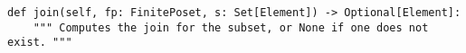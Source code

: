 \begin{verbatim}
def join(self, fp: FinitePoset, s: Set[Element]) -> Optional[Element]:
    """ Computes the join for the subset, or None if one does not exist. """
\end{verbatim}